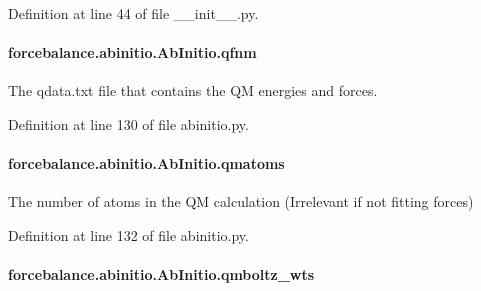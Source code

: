 Definition at line 44 of file \-\_\-\-\_\-init\-\_\-\-\_\-.\-py.

\hypertarget{classforcebalance_1_1abinitio_1_1AbInitio_ac93db408472034937e79572bf872886c}{
\paragraph[{qfnm}]{\setlength{\rightskip}{0pt plus 5cm}forcebalance.\-abinitio.\-Ab\-Initio.\-qfnm\hspace{0.3cm}{\ttfamily [inherited]}}}\label{classforcebalance_1_1abinitio_1_1AbInitio_ac93db408472034937e79572bf872886c}


The qdata.\-txt file that contains the Q\-M energies and forces. 



Definition at line 130 of file abinitio.\-py.

\hypertarget{classforcebalance_1_1abinitio_1_1AbInitio_af0760b8d33ce9dd044ccbe68fba7a1be}{
\paragraph[{qmatoms}]{\setlength{\rightskip}{0pt plus 5cm}forcebalance.\-abinitio.\-Ab\-Initio.\-qmatoms\hspace{0.3cm}{\ttfamily [inherited]}}}\label{classforcebalance_1_1abinitio_1_1AbInitio_af0760b8d33ce9dd044ccbe68fba7a1be}


The number of atoms in the Q\-M calculation (Irrelevant if not fitting forces) 



Definition at line 132 of file abinitio.\-py.

\hypertarget{classforcebalance_1_1abinitio_1_1AbInitio_a06ec6b12d81791ca94f599f41e56335a}{
\paragraph[{qmboltz\-\_\-wts}]{\setlength{\rightskip}{0pt plus 5cm}forcebalance.\-abinitio.\-Ab\-Initio.\-qmboltz\-\_\-wts\hspace{0.3cm}{\ttfamily [inherited]}}}\label{classforcebalance_1_1abinitio_1_1AbInitio_a06ec6b12d81791ca94f599f41e56335a}


